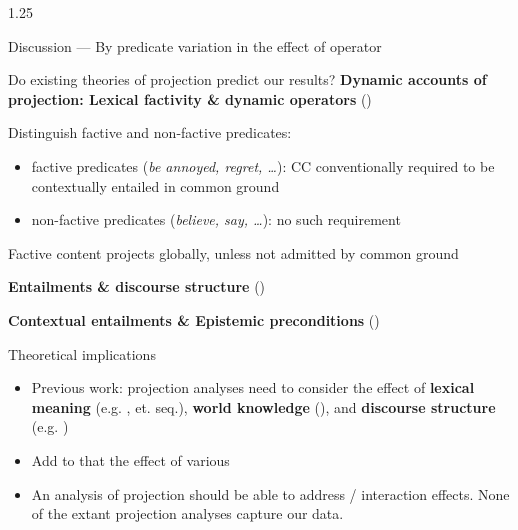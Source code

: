 \documentclass[final]{beamer}
\newlength{\colwidth}
\newlength{\vboxsep}
\begin{document}
\begin{frame}[t]
\begin{columns}[t]
\begin{column}{1.25\colwidth}
\begin{normalbox}{Discussion --- By predicate variation in the effect of operator}
			\end{normalbox}

			\vspace{\vboxsep}
			\begin{normalbox}{Do existing theories of projection predict our results?}
				\textbf{Dynamic accounts of projection: Lexical factivity \& dynamic operators} \hfill (\citealt{heim_projection_1983,van_der_sandt_presupposition_1992})

				Distinguish factive and non-factive predicates:
				\begin{itemize}
					\item factive predicates (\textit{be annoyed, regret, \dots}): CC conventionally required to be contextually entailed in common ground

					\item non-factive predicates (\textit{believe, say, …}): no such requirement

				\end{itemize}
				
				Factive content projects globally, unless not admitted by common ground

				\textbf{Entailments \& discourse structure} \hfill (\citealt{abrusan_predicting_2011,simons_best_2017})

				\textbf{Contextual entailments \& Epistemic preconditions} \hfill (\citealt{schlenker_triggering_2021})

			\end{normalbox}

			\vspace{\vboxsep}
			\begin{upshotbox}{Theoretical implications}
				\begin{itemize}
					\item Previous work: projection analyses need to consider the effect of \textbf{lexical meaning} (e.g. \citealt{kiparsky_fact_1970,karttunen_observations_1971}, et. seq.), \textbf{world knowledge} (\citealt{de_marneffe_did_2012,degen_prior_2021}), and \textbf{discourse structure} (e.g. \citealt{simons_best_2017,tonhauser_how_2018})
					
					\item Add to that the effect of various 
					
					\item An analysis of projection should be able to address  /  interaction effects. None of the extant projection analyses capture our data.


\end{itemize}
\end{upshotbox}
\end{column}
\end{columns}
\end{frame}
\end{document}
